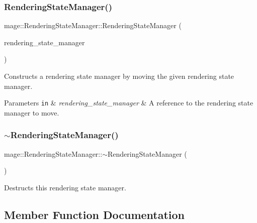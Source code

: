 \subsubsection{\texorpdfstring{Rendering\+State\+Manager()}{RenderingStateManager()}\hspace{0.1cm}{\footnotesize\ttfamily [3/3]}}
{\footnotesize\ttfamily mage\+::\+Rendering\+State\+Manager\+::\+Rendering\+State\+Manager (\begin{DoxyParamCaption}\item[{\hyperlink{classmage_1_1_rendering_state_manager}{Rendering\+State\+Manager} \&\&}]{rendering\+\_\+state\+\_\+manager }\end{DoxyParamCaption})\hspace{0.3cm}{\ttfamily [default]}}

Constructs a rendering state manager by moving the given rendering state manager.


\begin{DoxyParams}[1]{Parameters}
\mbox{\tt in}  & {\em rendering\+\_\+state\+\_\+manager} & A reference to the rendering state manager to move. \\
\hline
\end{DoxyParams}
\hypertarget{classmage_1_1_rendering_state_manager_ad4865219aaaac55dd53c4ab51af8d63f}{}\label{classmage_1_1_rendering_state_manager_ad4865219aaaac55dd53c4ab51af8d63f} 
\subsubsection{\texorpdfstring{$\sim$\+Rendering\+State\+Manager()}{~RenderingStateManager()}}
{\footnotesize\ttfamily mage\+::\+Rendering\+State\+Manager\+::$\sim$\+Rendering\+State\+Manager (\begin{DoxyParamCaption}{ }\end{DoxyParamCaption})\hspace{0.3cm}{\ttfamily [default]}}

Destructs this rendering state manager. 

\subsection{Member Function Documentation}
\hypertarget{classmage_1_1_rendering_state_manager_a0ae04882682ccccd4e75830bd2b4159b}{}\label{classmage_1_1_rendering_state_manager_a0ae04882682ccccd4e75830bd2b4159b} 
